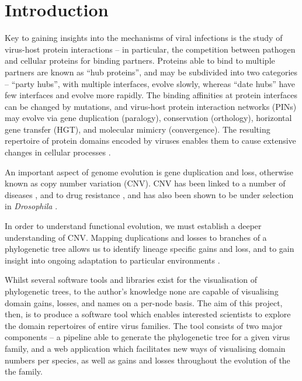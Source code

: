 \documentclass[12pt,a4paper]{article}
\begin{document}
\newpage
\section{Introduction}
Key to gaining insights into the mechanisms of viral infections is the study of virus-host protein interactions -- in particular, the competition between pathogen and cellular proteins for binding partners. Proteins able to bind to multiple partners are known as ``hub proteins'', and may be subdivided into two categories -- ``party hubs'', with multiple interfaces, evolve slowly, whereas ``date hubs'' have few interfaces and evolve more rapidly. The binding affinities at protein interfaces can be changed by mutations, and virus-host protein interaction networks (PINs) may evolve via gene duplication (paralogy), conservation (orthology), horizontal gene transfer (HGT), and molecular mimicry (convergence). The resulting repertoire of protein domains encoded by viruses enables them to cause extensive changes in cellular processes \citep{Brito2017}.

An important aspect of genome evolution is gene duplication and loss, otherwise known as copy number variation (CNV). CNV has been linked to a number of diseases \citep{lupski2007genomic}, and to drug resistance \citep{nair2008adaptive}, and has also been shown to be under selection in \textit{Drosophila} \citep{emerson2008natural}.

In order to understand functional evolution, we must establish a deeper understanding of CNV. Mapping duplications and losses to branches of a phylogenetic tree allows us to identify lineage specific gains and loss, and to gain insight into ongoing adaptation to particular environments \citep{ames2010gene,Ames2012}.

Whilst several software tools and libraries exist for the visualisation of phylogenetic trees, to the author's knowledge none are capable of visualising domain gains, losses, and names on a per-node basis. The aim of this project, then, is to produce a software tool which enables interested scientists to explore the domain repertoires of entire virus families. The tool consists of two major components -- a pipeline able to generate the phylogenetic tree for a given virus family, and a web application which facilitates new ways of visualising domain numbers per species, as well as gains and losses throughout the evolution of the the family.\\
\end{document}
